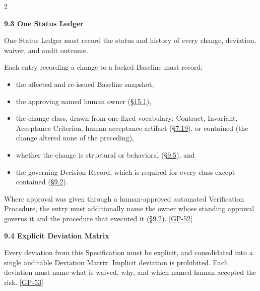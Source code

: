 \begin{multicols}{2}
\hypertarget{nss-9.3}{}

\par\smallskip\noindent\textbf{9.3 One Status Ledger}\par\nopagebreak

One Status Ledger must record the status and history of every change, deviation, waiver, and audit outcome.

Each entry recording a change to a locked Baseline must record:

\begin{itemize}\setlength{\itemsep}{0pt}\setlength{\parskip}{0pt}

\item the affected and re-issued Baseline snapshot,

\item the approving named human owner (\hyperlink{nss-15.1}{\S15.1}),

\item the change class, drawn from one fixed vocabulary: Contract, Invariant, Acceptance Criterion, human-acceptance artifact (\hyperlink{nss-7.19}{\S7.19}), or contained (the change altered none of the preceding),

\item whether the change is structural or behavioral (\hyperlink{nss-9.5}{\S9.5}), and

\item the governing Decision Record, which is required for every class except contained (\hyperlink{nss-9.2}{\S9.2}).

\end{itemize}

Where approval was given through a human-approved automated Verification Procedure, the entry must additionally name the owner whose standing approval governs it and the procedure that executed it (\hyperlink{nss-9.2}{\S9.2}). [\hyperlink{gp-52}{GP-52}]

\hypertarget{nss-9.4}{}

\par\smallskip\noindent\textbf{9.4 Explicit Deviation Matrix}\par\nopagebreak

Every deviation from this Specification must be explicit, and consolidated into a single auditable Deviation Matrix. Implicit deviation is prohibited. Each deviation must name what is waived, why, and which named human accepted the risk. [\hyperlink{gp-53}{GP-53}]

\hypertarget{nss-9.5}{}


\end{multicols}
